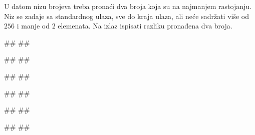 \begin{Answer}[ref=3-12]
\end{Answer}
\begin{Exercise}[label=3-13]
  U datom nizu brojeva treba pronaći dva broja koja su na najmanjem
  rastojanju. Niz se zadaje sa standardnog ulaza, sve do kraja ulaza,
  ali neće sadržati više od $256$ i manje od $2$ elemenata. Na izlaz
  ispisati razliku pronađena dva broja. 

\begin{minitest}
\begin{test}{1}
#\naslovUlaz#
##

#\naslovIzlaz#
##
\end{test}
\end{minitest}
\begin{minitest}
\begin{test}{2}
#\naslovUlaz#
##
  
#\naslovIzlaz#
##
\end{test}
\end{minitest}
\begin{minitest}
\begin{test}{3}
#\naslovUlaz#
##

#\naslovIzlaz#
##
\end{test}
\end{minitest}
  
\end{Exercise}

